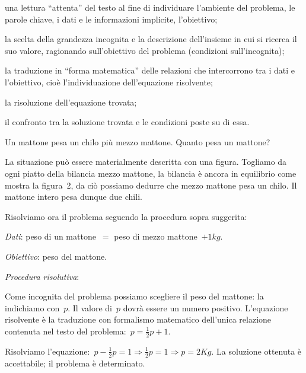 \begin{enumeratea}
\item una lettura ``attenta'' del
testo al fine di individuare l'ambiente del problema,
le parole chiave, i dati e le informazioni implicite,
l'obiettivo;
\item la scelta della grandezza incognita e la descrizione
dell'insieme in cui si ricerca il suo valore,
ragionando sull'obiettivo del problema (condizioni sull'incognita);
\item la traduzione in ``forma matematica'' delle relazioni che intercorrono 
tra i dati e l'obiettivo, cioè l'individuazione dell'equazione risolvente;
\item la risoluzione dell'equazione trovata;
\item il confronto tra la soluzione trovata e le condizioni poste su di essa.
\end{enumeratea}

\begin{problema}
 Un mattone pesa un chilo più mezzo mattone. Quanto pesa un mattone?
\end{problema}

\begin{soluzione}
 La situazione può essere materialmente descritta con una figura.
Togliamo da ogni piatto della bilancia mezzo mattone, la bilancia è
ancora in equilibrio come mostra la figura~2, da ciò possiamo
dedurre che mezzo mattone pesa un chilo. Il mattone intero pesa dunque
due chili.
\begin{center}
 
\end{center}

Risolviamo ora il problema seguendo la procedura sopra suggerita:

\emph{Dati}: peso di un mattone~$=$ peso di mezzo mattone~$+ 1\unit{kg}.$

\emph{Obiettivo}: peso del mattone.

\emph{Procedura risolutiva}:

Come incognita del problema possiamo scegliere il peso del mattone: la
indichiamo con~$p$.
Il valore di~$p$ dovrà essere un numero positivo.
L'equazione risolvente è la traduzione con formalismo
matematico dell'unica relazione contenuta nel testo del
problema:~$p=\frac{1}{2}p+1$.

Risolviamo l'equazione:~$p-\frac{1}{2}p=1\Rightarrow\frac{1}{2}p=1\Rightarrow 
p=2\unit{Kg}.$
La soluzione ottenuta è accettabile; il problema è determinato.
\end{soluzione}

